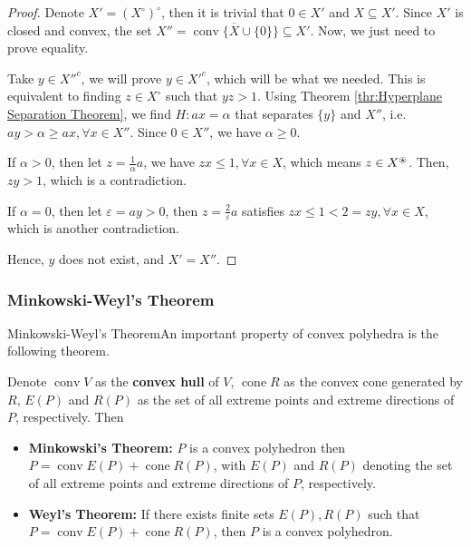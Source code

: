 \begin{proof}
  Denote \( X' = (X^{\circ})^{\circ} \), then it is trivial that \( 0 \in X' \)
  and \( X \subseteq X' \). Since \( X' \) is closed and convex, the set \( X''
  = \overline{\operatorname{conv} \{X \cup \{0\}  \}  } \subseteq X' \). Now, we
  just need to prove equality.

  Take \( y \in X''^{c} \), we will prove \( y \in X'^{c} \), which will be what
  we needed. This is equivalent to finding \( z \in X^{\circ} \) such that \( yz
  > 1\). Using Theorem \ref{thr:Hyperplane Separation Theorem}, we find \( H: ax
  = \alpha\) that separates \( \{y\}   \) and \( X'' \), i.e. \( ay > \alpha
  \ge ax, \forall x \in X'' \). Since \( 0 \in X'' \), we have \( \alpha \ge  0
  \).

  If \( \alpha > 0 \), then let \( z = \frac{1}{\alpha} a \), we have \( zx \le 1,
  \forall x \in X\), which means \( z \in X^{\ostar} \). Then, \( zy > 1 \),
  which is a contradiction.

  If \( \alpha = 0 \), then let \( \varepsilon = ay > 0 \), then \( z =
  \frac{2}{\varepsilon}a \) satisfies \( zx \le  1 < 2 = zy, \forall x \in X \),
  which is another contradiction.

  Hence, \( y \) does not exist, and \( X' = X'' \).
\end{proof}
\fi
\iffalse
\subsubsection{Minkowski-Weyl's Theorem} %
\label{sec:Minkowski-Weyl's Theorem}
Minkowski-Weyl's TheoremAn important property of convex polyhedra is the following theorem.

\begin{theorem}
\label{thr:Minkowski-Weyl's Theorem}
  Denote \( \operatorname{conv} V \) as the \textbf{convex hull} of \( V \), \(
  \operatorname{cone} R\) as the convex cone generated by \( R \), \( E(P) \)
  and \( R(P) \) as the set of all extreme points and extreme directions of \( P
  \), respectively. Then
  \begin{itemize}
  \item \textbf{Minkowski's Theorem:}
  \( P \) is a convex polyhedron then
  \( P = \operatorname{conv} E(P) + \operatorname{cone} R(P) \),
  with \( E(P) \) and \( R(P) \) denoting the set of all extreme points and
  extreme directions of \( P \), respectively.
\item \textbf{Weyl's Theorem:}
  If there exists finite sets \( E(P), R(P)  \) such that \( P = \operatorname{conv}
  E(P) + \operatorname{cone} R(P)\), then \( P \) is a convex polyhedron.
  \end{itemize}
\end{theorem}

